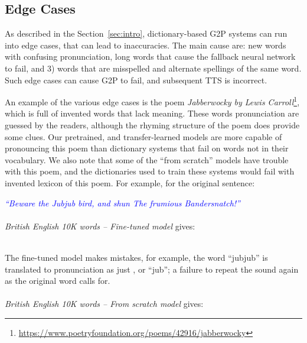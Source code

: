 \subsection{Edge Cases}

As described in the Section~\ref{sec:intro}, dictionary-based G2P systems can run into edge cases, that can lead to inaccuracies. The main cause are: new words with confusing pronunciation, long words that cause the fallback neural network to fail, and 3) words that are misspelled and alternate spellings of the same word. Such edge cases can cause G2P to fail, and subsequent TTS is incorrect.

An example of the various edge cases is the poem \emph{Jabberwocky by Lewis Carroll}\footnote{\url{https://www.poetryfoundation.org/poems/42916/jabberwocky}}, which is full of invented words that lack meaning. These words pronunciation are guessed by the readers, although the rhyming structure of the poem does provide some clues. Our pretrained, and transfer-learned models are more capable of pronouncing this poem than dictionary systems that fail on words not in their vocabulary. We also note that some of the ``from scratch'' models have trouble with this poem, and the dictionaries used to train these systems would fail with invented lexicon of this poem. For example, for the original sentence:

\emph{\textcolor{blue}{``Beware the Jubjub bird, and shun The frumious Bandersnatch!''}}
\\
\\
\textit{British English 10K words -- Fine-tuned model} gives:

\textcolor{blue}{}
\\
The fine-tuned model makes mistakes, for example, the word ``jubjub'' is translated to pronunciation as just , or ``jub''; a failure to repeat the sound again as the original word calls for.
\\
\\
\textit{British English 10K words -- From scratch model} gives:

